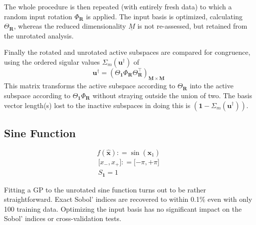 \documentclass[preprint,12pt]{elsarticle}
\newcommand*{\M}[1]{\ensuremath{#1}\xspace}
\newcommand*{\vr}[1]{\M{\mathbf{#1}}}
\newcommand*{\deq}{\M{\mathrel{\mathop:}=}}
\begin{document}
        The whole procedure is then repeated (with entirely fresh data) to which a random input rotation $\Phi_{\vr{R}}$ is applied. The input basis is optimized, calculating $\Theta_{\vr{R}}$, whereas the reduced dimensionality \M{\underline{M}} is not re-assessed, but retained from the unrotated analysis.

        Finally the rotated and unrotated active subspaces are compared for congruence, using the ordered sigular values $\Sigma_m(\vr{u^{\dag}})$ of
        \begin{equation}
            \vr{u^{\dag}} = \left(\Theta_{\vr{1}} \Phi_{\vr{R}} \Theta_{\vr{R}}^{\intercal}\right)_{\underline{\vr{M}}\times\underline{\vr{M}}}
        \end{equation}
        This matrix transforms the active subspace according to $\Theta_{\vr{R}}$ into the active subspace according to $\Theta_{\vr{1}} \Phi_{\vr{R}}$ without straying outside the union of two. The basis vector length(s) lost to the inactive subspaces in doing this is $(\vr{1} - \Sigma_m(\vr{u^{\dag}}))$.
 

        \subsection{Sine Function} \label{sub:Results:Sin}
            \begin{equation} \label{def:Sin}
                f(\vr{\hat{x}}) \deq \sin(\vr{\hat{x}}_1)
            \end{equation}
            \begin{gather*}
                \lbrack x_-, x_+ \rbrack \deq \lbrack -\pi, +\pi \rbrack \\
                S_{\vr{1}} = 1
            \end{gather*}

            Fitting a GP to the unrotated sine function turns out to be rather straightforward. Exact Sobol' indices are recovered to within 0.1\% even with only 100 training data. Optimizing the input basis has no significant impact on the Sobol' indices or cross-validation tests.

\end{document}
